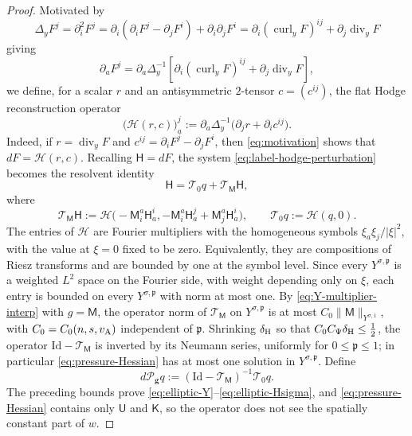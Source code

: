 \documentclass[11pt,reqno]{amsart}
\theoremstyle{plain}
\theoremstyle{definition}
\theoremstyle{remark}
\numberwithin{equation}{section}
\DeclareMathOperator{\Div}{div}
\DeclareMathOperator{\curl}{curl}
\newcommand{\preg}{\mathfrak p}
\newcommand{\Ufield}{\mathsf U}
\newcommand{\Kmat}{\mathsf K}
\newcommand{\Mmat}{\mathsf M}
\newcommand{\Hess}{\mathsf H}     %
\newcommand{\gmetric}{\mathbf g}
\begin{document}
\begin{proof}
Motivated by
\begin{equation}\label{eq:motivation}
    \Delta_yF^j=\partial_i^2F^j=\partial_i(\partial_iF^j-\partial_jF^i)+\partial_i\partial_jF^i=\partial_i(\curl_y F)^{ij}+\partial_j\Div_y F
\end{equation}
giving
\[
\partial_aF^j =\partial_a\Delta^{-1}_y\left[\partial_i(\curl_y F)^{ij}+\partial_j\Div_y F\right],
\]
we define, for a scalar $r$ and an antisymmetric $2$-tensor $c=(c^{ij})$, the flat
Hodge reconstruction operator
\begin{equation}\label{eq:Hodgereconstruction}
    \big(\mathscr H(r,c)\big)_a^j
 :=\partial_a\Delta_y^{-1}\big(\partial_jr+\partial_ic^{ij}\big).
\end{equation}
Indeed, if $r=\Div_{y}F$ and
$c^{ij}=\partial_iF^j-\partial_jF^i$, then \eqref{eq:motivation} shows that
$dF=\mathscr H(r,c)$.  Recalling $\Hess=dF$, the system
\eqref{eq:label-hodge-perturbation} becomes the resolvent identity
\begin{equation}\label{eq:pressure-Hessian}
 \Hess=\mathscr T_0q+\mathscr T_{\Mmat}\Hess,
\end{equation}
where
\[
 \mathscr T_{\Mmat}\Hess
 :=\mathscr H\big(-\Mmat^a_i\Hess_a^i,
       -\Mmat^a_i\Hess_a^j+\Mmat^a_j\Hess_a^i\big), \qquad \mathscr T_0q:=\mathscr H(q,0).
\]
The entries of $\mathscr H$ are Fourier multipliers with the
homogeneous symbols $\xi_a\xi_j/|\xi|^2$, with the value at $\xi=0$ fixed
to be zero. Equivalently, they are compositions of Riesz transforms and are
bounded by one at the symbol level. Since every
$Y^{\sigma,\preg}$ is a weighted $L^2$ space
on the Fourier side, with weight depending only on $\xi$, each entry is
bounded on every $Y^{\sigma,\preg}$ with norm at most one.  By \eqref{eq:Y-multiplier-interp} with $g=\Mmat$, the operator norm of
$\mathscr T_{\Mmat}$ on $Y^{\sigma,\preg}$
is at most $C_0\|\Mmat\|_{Y^{\sigma,1}}$, with $C_0=C_0(n,s,v_{\rm A})$
independent of $\preg$.  Shrinking $\delta_{\rm H}$ so that
$C_0C_\Psi\delta_{\rm H}\le\tfrac12$, the operator
$\mathrm{Id}-\mathscr T_{\Mmat}$ is inverted by its Neumann series, uniformly
for $0\le\preg\le1$; in particular \eqref{eq:pressure-Hessian} has at most one
solution in $Y^{\sigma,\preg}$.  Define
\begin{equation}\label{eq:neumann-hodge-derivative}
 d\mathcal P_{\gmetric}q
 :=(\mathrm{Id}-\mathscr T_{\Mmat})^{-1}\mathscr T_0q .
\end{equation}
The preceding bounds prove \eqref{eq:elliptic-Y}--\eqref{eq:elliptic-Hsigma},
and \eqref{eq:pressure-Hessian} contains only $\Ufield$ and $\Kmat$, so the
operator does not see the spatially constant part of $w$.


\end{proof}
\end{document}
